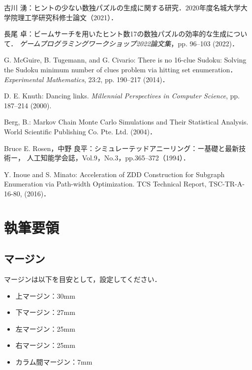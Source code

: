 \documentclass[a4paper, 9pt]{jarticle}
\begin{document}
\begin{論文概要}
\begin{thebibliography}{10}

  古川 湧：ヒントの少ない数独パズルの生成に関する研究．$2020$年度名城大学大学院理工学研究科修士論文（2021）．
  
  長尾 卓：ビームサーチを用いたヒント数17の数独パズルの効率的な生成について．
  {\it ゲームプログラミングワークショップ2022論文集}，pp. 96--103 (2022)．
  
  G. McGuire, B. Tugemann, and G. Civario:
  There is no 16-clue Sudoku: Solving the Sudoku minimum number of clues problem via hitting set enumeration．
  {\it Experimental Mathematics}, 23:2, pp. 190--217 (2014)．
  
  D. E. Knuth: Dancing links. 
  {\it Millennial Perspectives in Computer Science}, pp. 187--214 (2000).

  Berg, B.: Markov Chain Monte Carlo Simulations and Their Statistical
  Analysis. World Scientific Publishing Co. Pte. Ltd. (2004)．

  Bruce E. Rosen，中野 良平：シミュレーテッドアニーリング：ー基礎と最新技術ー，
  人工知能学会誌，Vol.9，No.3，pp.365--372（1994）．
  
  Y. Inoue and S. Minato: Acceleration of ZDD Construction for Subgraph 
  Enumeration via Path-width Optimization. TCS Technical Report, 
  TSC-TR-A-16-80, (2016)．
  
\end{thebibliography}


\section{執筆要領}

\subsection{マージン}
マージンは以下を目安として，設定してください．

\begin{itemize}
\item 上マージン：30mm
\item 下マージン：27mm
\item 左マージン：25mm
\item 右マージン：25mm
\item カラム間マージン：7mm
\end{itemize}


\end{論文概要}
\end{document}

